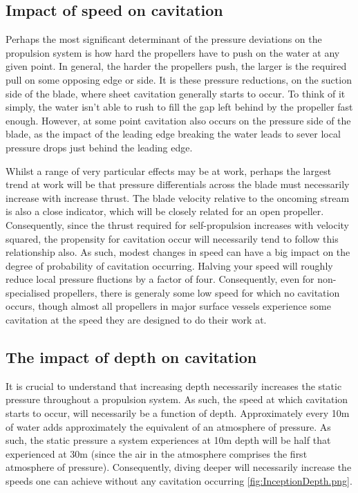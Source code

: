 \documentclass{article}\usepackage[]{graphicx}\usepackage[]{color}
\begin{document}
\subsection{Impact of speed on cavitation}
Perhaps the most significant determinant of the pressure deviations on the propulsion system is how hard the propellers have to push on the water at any given point.  In general, the harder the propellers push, the larger is the required pull on some opposing edge or side.  It is these pressure reductions, on the suction side of the blade, where sheet cavitation generally starts to occur.  To think of it simply, the water isn't able to rush to fill the gap left behind by the propeller fast enough.  However, at some point cavitation also occurs on the pressure side of the blade, as the impact of the leading edge breaking the water leads to sever local pressure drops just behind the leading edge.

Whilst a range of very particular effects may be at work, perhaps the largest trend at work will be that pressure differentials across the blade must necessarily increase with increase thrust.  The blade velocity relative to the oncoming stream is also a close indicator, which will be closely related for an open propeller.  Consequently, since the thrust required for self-propulsion increases with velocity squared, the propensity for cavitation occur will necessarily tend to follow this relationship also.  As such, modest changes in speed can have a big impact on the degree of probability of cavitation occurring. Halving your speed will roughly reduce local pressure fluctions by a factor of four. Consequently, even for non-specialised propellers, there is generaly some low speed for which no cavitation occurs, though almost all propellers in major surface vessels experience some cavitation at the speed they are designed to do their work at.

\subsection{The impact of depth on cavitation}
It is crucial to understand that increasing depth necessarily increases the static pressure throughout a propulsion system.  As such, the speed at which cavitation starts to occur, will necessarily be a function of depth.  Approximately every 10m of water adds approximately the equivalent of an atmosphere of pressure.  As such, the static pressure a system experiences at 10m depth will be half that experienced at 30m (since the air in the atmosphere comprises the first atmosphere of pressure).  Consequently, diving deeper will necessarily increase the speeds one can achieve without any cavitation occurring \ref{fig:InceptionDepth.png}.
\end{document}
